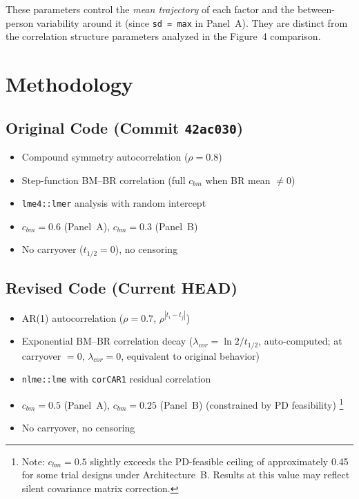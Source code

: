 \documentclass[11pt]{article}
\begin{document}
These parameters control the \emph{mean trajectory} of
each factor and the between-person variability around it
(since \texttt{sd = max} in Panel~A). They are distinct
from the correlation structure parameters analyzed in the
Figure~4 comparison.

\section{Methodology}

\subsection{Original Code (Commit \texttt{42ac030})}

\begin{itemize}[nosep]
\item Compound symmetry autocorrelation ($\rho = 0.8$)
\item Step-function BM--BR correlation (full $c_{bm}$ when
  BR mean $\neq 0$)
\item \texttt{lme4::lmer} analysis with random intercept
\item $c_{bm} = 0.6$ (Panel~A), $c_{bm} = 0.3$ (Panel~B)
\item No carryover ($t_{1/2} = 0$), no censoring
\end{itemize}

\subsection{Revised Code (Current HEAD)}

\begin{itemize}[nosep]
\item AR(1) autocorrelation ($\rho = 0.7$,
  $\rho^{|t_i - t_j|}$)
\item Exponential BM--BR correlation decay
  ($\lambda_{cor} = \ln 2 / t_{1/2}$, auto-computed;
  at carryover $= 0$, $\lambda_{cor} = 0$, equivalent
  to original behavior)
\item \texttt{nlme::lme} with \texttt{corCAR1} residual
  correlation
\item $c_{bm} = 0.5$ (Panel~A), $c_{bm} = 0.25$ (Panel~B)
  (constrained by PD feasibility)%
  \footnote{Note: $c_{bm} = 0.5$ slightly exceeds the
  PD-feasible ceiling of approximately 0.45 for some trial
  designs under Architecture~B. Results at this value may
  reflect silent covariance matrix correction.}
\item No carryover, no censoring
\end{itemize}
\end{document}
